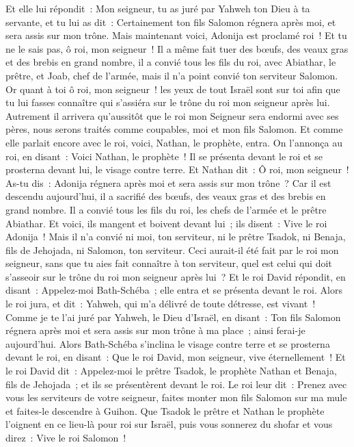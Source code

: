 \begin{multicols}{2}
Et elle lui répondit~: Mon seigneur, tu as juré par Yahweh ton Dieu à ta servante, et tu lui as dit~: Certainement ton fils Salomon régnera après moi, et sera assis sur mon trône.
Mais maintenant voici, Adonija est proclamé roi~! Et tu ne le sais pas, ô roi, mon seigneur~!
Il a même fait tuer des bœufs, des veaux gras et des brebis en grand nombre, il a convié tous les fils du roi, avec Abiathar, le prêtre, et Joab, chef de l'armée, mais il n'a point convié ton serviteur Salomon.
Or quant à toi ô roi, mon seigneur~! les yeux de tout Israël sont sur toi afin que tu lui fasses connaître qui s'assiéra sur le trône du roi mon seigneur après lui.
Autrement il arrivera qu'aussitôt que le roi mon Seigneur sera endormi avec ses pères, nous serons traités comme coupables, moi et mon fils Salomon.
Et comme elle parlait encore avec le roi, voici, Nathan, le prophète, entra.
On l'annonça au roi, en disant~: Voici Nathan, le prophète~! Il se présenta devant le roi et se prosterna devant lui, le visage contre terre.
Et Nathan dit~: Ô roi, mon seigneur~! As-tu dis~: Adonija régnera après moi et sera assis sur mon trône~?
Car il est descendu aujourd'hui, il a sacrifié des bœufs, des veaux gras et des brebis en grand nombre. Il a convié tous les fils du roi, les chefs de l'armée et le prêtre Abiathar. Et voici, ils mangent et boivent devant lui~; ils disent~: Vive le roi Adonija~!
Mais il n'a convié ni moi, ton serviteur, ni le prêtre Tsadok, ni Benaja, fils de Jehojada, ni Salomon, ton serviteur.
Ceci aurait-il été fait par le roi mon seigneur, sans que tu aies fait connaître à ton serviteur, quel est celui qui doit s'asseoir sur le trône du roi mon seigneur après lui~?
Et le roi David répondit, en disant~: Appelez-moi Bath-Schéba~; elle entra et se présenta devant le roi.
Alors le roi jura, et dit~: Yahweh, qui m'a délivré de toute détresse, est vivant~!
Comme je te l'ai juré par Yahweh, le Dieu d'Israël, en disant~: Ton fils Salomon régnera après moi et sera assis sur mon trône à ma place~; ainsi ferai-je aujourd'hui.
Alors Bath-Schéba s'inclina le visage contre terre et se prosterna devant le roi, en disant~: Que le roi David, mon seigneur, vive éternellement~!
Et le roi David dit~: Appelez-moi le prêtre Tsadok, le prophète Nathan et Benaja, fils de Jehojada~; et ils se présentèrent devant le roi.
Le roi leur dit~: Prenez avec vous les serviteurs de votre seigneur, faites monter mon fils Salomon sur ma mule et faites-le descendre à Guihon.
Que Tsadok le prêtre et Nathan le prophète l'oignent en ce lieu-là pour roi sur Israël, puis vous sonnerez du shofar et vous direz~: Vive le roi Salomon~!

\end{multicols}
